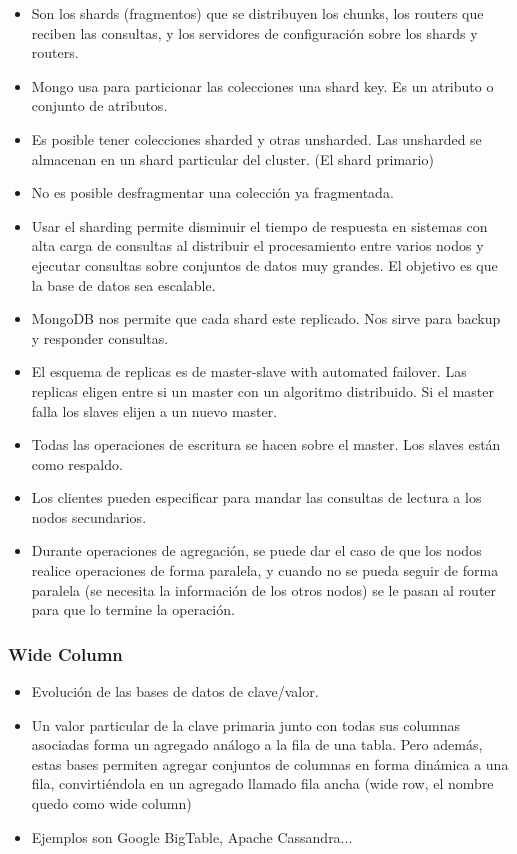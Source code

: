 \begin{itemize}
\item Son los shards (fragmentos) que se distribuyen los chunks, los routers que reciben las consultas, y los servidores de configuración sobre los shards y routers.
\item Mongo usa para particionar las colecciones una shard key. Es un atributo o conjunto de atributos.
\item Es posible tener colecciones sharded y otras unsharded. Las unsharded se almacenan en un shard particular del cluster. (El shard primario)
\item No es posible desfragmentar una colección ya fragmentada.
\item Usar el sharding permite disminuir el tiempo de respuesta en sistemas con alta carga de consultas al distribuir el procesamiento entre varios nodos y ejecutar consultas sobre conjuntos de datos muy grandes. El objetivo es que la base de datos sea escalable.
\item MongoDB nos permite que cada shard este replicado. Nos sirve para backup y responder consultas.
\item El esquema de replicas es de master-slave with automated failover. Las replicas eligen entre si un master con un algoritmo distribuido. Si el master falla los slaves elijen a un nuevo master.
\item Todas las operaciones de escritura se hacen sobre el master. Los slaves están como respaldo.
\item Los clientes pueden especificar para mandar las consultas de lectura a los nodos secundarios.
\item Durante operaciones de agregación, se puede dar el caso de que los nodos realice operaciones de forma paralela, y cuando no se pueda seguir de forma paralela (se necesita la información de los otros nodos) se le pasan al router para que lo termine la operación.
\end{itemize}


\subsubsection*{Wide Column}

\begin{itemize}
\item Evolución de las bases de datos de clave/valor.
\item Un valor particular de la clave primaria junto con todas sus columnas asociadas forma un agregado análogo a la fila de una tabla. Pero además, estas bases permiten agregar conjuntos de columnas en forma dinámica a una fila, convirtiéndola en un agregado llamado fila ancha (wide row, el nombre quedo como wide column)
\item Ejemplos son Google BigTable, Apache Cassandra...
\end{itemize}

